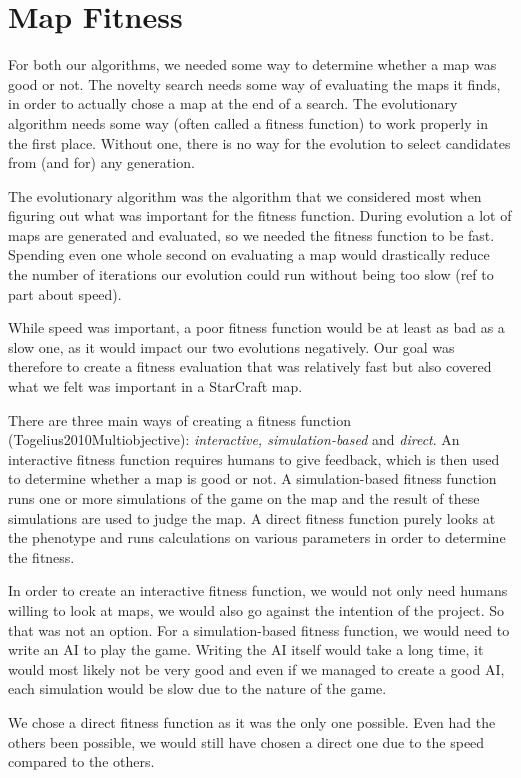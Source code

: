 \section{Map Fitness}
\label{MapFitness}

For both our algorithms, we needed some way to determine whether a map was good or not. The novelty search needs some way of evaluating the maps it finds, in order to actually chose a map at the end of a search. The evolutionary algorithm needs some way (often called a fitness function) to work properly in the first place. Without one, there is no way for the evolution to select candidates from (and for) any generation.

The evolutionary algorithm was the algorithm that we considered most when figuring out what was important for the fitness function. During evolution a lot of maps are generated and evaluated, so we needed the fitness function to be fast. Spending even one whole second on evaluating a map would drastically reduce the number of iterations our evolution could run without being too slow (ref to part about speed).

While speed was important, a poor fitness function would be at least as bad as a slow one, as it would impact our two evolutions negatively. Our goal was therefore to create a fitness evaluation that was relatively fast but also covered what we felt was important in a StarCraft map.

There are three main ways of creating a fitness function (Togelius2010Multiobjective): \textit{interactive, simulation-based} and \textit{direct}. An interactive fitness function requires humans to give feedback, which is then used to determine whether a map is good or not. A simulation-based fitness function runs one or more simulations of the game on the map and the result of these simulations are used to judge the map. A direct fitness function purely looks at the phenotype and runs calculations on various parameters in order to determine the fitness.

In order to create an interactive fitness function, we would not only need humans willing to look at maps, we would also go against the intention of the project. So that was not an option. For a simulation-based fitness function, we would need to write an AI to play the game. Writing the AI itself would take a long time, it would most likely not be very good and even if we managed to create a good AI, each simulation would be slow due to the nature of the game.

We chose a direct fitness function as it was the only one possible. Even had the others been possible, we would still have chosen a direct one due to the speed compared to the others. 

